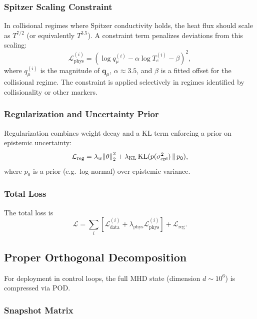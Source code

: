 \documentclass[11pt]{article}
\begin{document}
\subsubsection{Spitzer Scaling Constraint}

In collisional regimes where Spitzer conductivity holds, the heat flux should scale as $T^{7/2}$ (or equivalently $T^{3.5}$). A constraint term penalizes deviations from this scaling:
\begin{equation}
  \mathcal{L}_\mathrm{phys}^{(i)} = \left( \log q_\mu^{(i)} - \alpha \log T_e^{(i)} - \beta \right)^2,
\end{equation}
where $q_\mu^{(i)}$ is the magnitude of $\bm{q}_\mu$, $\alpha \approx 3.5$, and $\beta$ is a fitted offset for the collisional regime. The constraint is applied selectively in regimes identified by collisionality or other markers.

\subsubsection{Regularization and Uncertainty Prior}

Regularization combines weight decay and a KL term enforcing a prior on epistemic uncertainty:
\begin{equation}
  \mathcal{L}_\mathrm{reg} = \lambda_w \norm{\theta}_2^2 + \lambda_\mathrm{KL} \, \mathrm{KL}(p(\sigma_{\mathrm{epi}}^2) \,\|\, p_0),
\end{equation}
where $p_0$ is a prior (e.g.\ log-normal) over epistemic variance.

\subsubsection{Total Loss}

The total loss is
\begin{equation}
  \mathcal{L} = \sum_i \left[ \mathcal{L}_\mathrm{data}^{(i)} + \lambda_\mathrm{phys}\mathcal{L}_\mathrm{phys}^{(i)} \right] + \mathcal{L}_\mathrm{reg}.
\end{equation}

\subsection{Proper Orthogonal Decomposition}

For deployment in control loops, the full MHD state (dimension $d \sim 10^6$) is compressed via POD.

\subsubsection{Snapshot Matrix}
\end{document}
